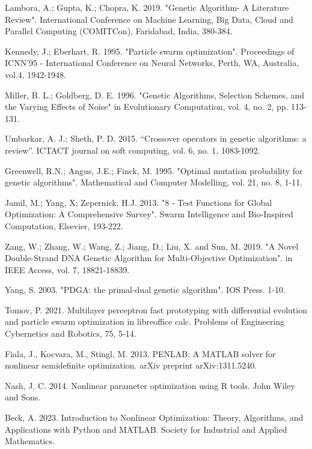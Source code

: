 \documentclass[runningheads]{llncs}
\begin{document}
\begin{thebibliography}{8}

 Lambora, A.; Gupta, K.; Chopra, K. 2019. "Genetic Algorithm- A Literature Review". International Conference on Machine Learning, Big Data, Cloud and Parallel Computing (COMITCon), Faridabad, India, 380-384.

 Kennedy, J.; Eberhart, R. 1995. "Particle swarm optimization". Proceedings of ICNN'95 - International Conference on Neural Networks, Perth, WA, Australia, vol.4, 1942-1948.

 Miller, B. L.; Goldberg, D. E. 1996. "Genetic Algorithms, Selection Schemes, and the Varying Effects of Noise" in Evolutionary Computation, vol. 4, no. 2, pp. 113-131.

 Umbarkar, A. J.; Sheth, P. D. 2015. “Crossover operators in genetic algorithms: a review”. ICTACT journal on soft computing, vol. 6, no. 1, 1083-1092.

 Greenwell, R.N.; Angus, J.E.; Finck, M. 1995. "Optimal mutation probability for genetic algorithms". Mathematical and Computer Modelling, vol. 21, no. 8, 1-11.

 Jamil, M.; Yang, X; Zepernick, H.J. 2013. "8 - Test Functions for Global Optimization: A Comprehensive Survey". Swarm Intelligence and Bio-Inspired Computation, Elsevier, 193-222.

 Zang, W.; Zhang, W.; Wang, Z.; Jiang, D.; Liu, X. and Sun, M. 2019. "A Novel Double-Strand DNA Genetic Algorithm for Multi-Objective Optimization". in IEEE Access, vol. 7, 18821-18839.

 Yang, S. 2003. "PDGA: the primal-dual genetic algorithm". IOS Press. 1-10.

 Tomov, P. 2021. Multilayer perceptron fast prototyping with differential evolution and particle swarm optimization in libreoffice calc. Problems of Engineering Cybernetics and Robotics, 75, 5-14.

 Fiala, J., Kocvara, M., Stingl, M. 2013. PENLAB: A MATLAB solver for nonlinear semidefinite optimization. arXiv preprint arXiv:1311.5240.

 Nash, J. C. 2014. Nonlinear parameter optimization using R tools. John Wiley and Sons.

 Beck, A. 2023. Introduction to Nonlinear Optimization: Theory, Algorithms, and Applications with Python and MATLAB. Society for Industrial and Applied Mathematics.


\end{thebibliography}
\end{document}
